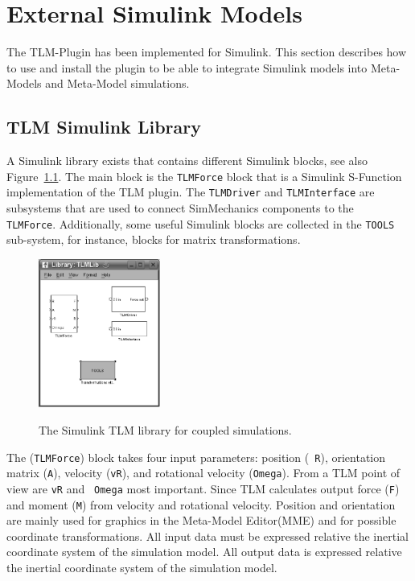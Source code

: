 \chapter{External Simulink Models}
\label{MMSimulink}
The TLM-Plugin has been implemented for Simulink. This
section describes how to use and install the plugin to be able to
integrate Simulink models into Meta-Models and Meta-Model simulations.

\section{TLM Simulink Library}
\label{sec:TLMLib}
A Simulink library exists that contains different Simulink blocks, see
also Figure~\ref{fig:TLMLib}. The main block is the {\tt TLMForce}
block that is a Simulink S-Function implementation of the TLM
plugin. The {\tt TLMDriver} and {\tt TLMInterface} are subsystems that
are used to connect SimMechanics components to the {\tt
TLMForce}. Additionally, some useful Simulink blocks are collected in
the {\tt TOOLS} sub-system, for instance, blocks for matrix
transformations.

\begin{figure}[ht]\begin{center}
   {\includegraphics[width=4cm]{figs/TLMLib.png}}
    \caption{The Simulink TLM library for coupled simulations.}
    \label{fig:TLMLib}
\end{center}\end{figure}

The ({\tt TLMForce}) block takes four input parameters: position ({\tt
R}), orientation matrix ({\tt A}), velocity ({\tt vR}), and rotational
velocity ({\tt Omega}). From a TLM point of view are {\tt vR} and {\tt
Omega} most important. Since TLM calculates output force ({\tt F}) and
moment ({\tt M}) from velocity and rotational velocity. Position and
orientation are mainly used for graphics in the Meta-Model Editor(MME)
and for possible coordinate transformations. All input data must be
expressed relative the inertial coordinate system of the simulation
model. All output data is expressed relative the inertial coordinate
system of the simulation model.

